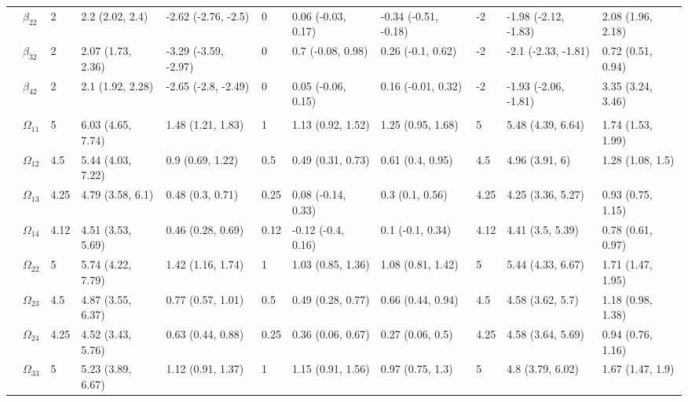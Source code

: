 \documentclass[]{article}
\begin{document}
\begin{landscape}
\begin{table}[t]
\begin{tabular}{lllllllllll}
\hspace{1em} & $\beta_{22}$ & 2 & 2.2 (2.02, 2.4) & -2.62 (-2.76, -2.5) & 0 & 0.06 (-0.03, 0.17) & -0.34 (-0.51, -0.18) & -2 & -1.98 (-2.12, -1.83) & 2.08 (1.96, 2.18)\\
\hspace{1em} & $\beta_{32}$ & 2 & 2.07 (1.73, 2.36) & -3.29 (-3.59, -2.97) & 0 & 0.7 (-0.08, 0.98) & 0.26 (-0.1, 0.62) & -2 & -2.1 (-2.33, -1.81) & 0.72 (0.51, 0.94)\\
\hspace{1em} & $\beta_{42}$ & 2 & 2.1 (1.92, 2.28) & -2.65 (-2.8, -2.49) & 0 & 0.05 (-0.06, 0.15) & 0.16 (-0.01, 0.32) & -2 & -1.93 (-2.06, -1.81) & 3.35 (3.24, 3.46)\\
\addlinespace[0.3em]
\multicolumn{11}{l}{\textbf{ }}\\
\hspace{1em} & $\Omega_{11}$ & 5 & 6.03 (4.65, 7.74) & 1.48 (1.21, 1.83) & 1 & 1.13 (0.92, 1.52) & 1.25 (0.95, 1.68) & 5 & 5.48 (4.39, 6.64) & 1.74 (1.53, 1.99)\\
\hspace{1em} & $\Omega_{12}$ & 4.5 & 5.44 (4.03, 7.22) & 0.9 (0.69, 1.22) & 0.5 & 0.49 (0.31, 0.73) & 0.61 (0.4, 0.95) & 4.5 & 4.96 (3.91, 6) & 1.28 (1.08, 1.5)\\
\hspace{1em} & $\Omega_{13}$ & 4.25 & 4.79 (3.58, 6.1) & 0.48 (0.3, 0.71) & 0.25 & 0.08 (-0.14, 0.33) & 0.3 (0.1, 0.56) & 4.25 & 4.25 (3.36, 5.27) & 0.93 (0.75, 1.15)\\
\hspace{1em} & $\Omega_{14}$ & 4.12 & 4.51 (3.53, 5.69) & 0.46 (0.28, 0.69) & 0.12 & -0.12 (-0.4, 0.16) & 0.1 (-0.1, 0.34) & 4.12 & 4.41 (3.5, 5.39) & 0.78 (0.61, 0.97)\\
\hspace{1em} & $\Omega_{22}$ & 5 & 5.74 (4.22, 7.79) & 1.42 (1.16, 1.74) & 1 & 1.03 (0.85, 1.36) & 1.08 (0.81, 1.42) & 5 & 5.44 (4.33, 6.67) & 1.71 (1.47, 1.95)\\
\hspace{1em} & $\Omega_{23}$ & 4.5 & 4.87 (3.55, 6.37) & 0.77 (0.57, 1.01) & 0.5 & 0.49 (0.28, 0.77) & 0.66 (0.44, 0.94) & 4.5 & 4.58 (3.62, 5.7) & 1.18 (0.98, 1.38)\\
\hspace{1em} & $\Omega_{24}$ & 4.25 & 4.52 (3.43, 5.76) & 0.63 (0.44, 0.88) & 0.25 & 0.36 (0.06, 0.67) & 0.27 (0.06, 0.5) & 4.25 & 4.58 (3.64, 5.69) & 0.94 (0.76, 1.16)\\
\hspace{1em} & $\Omega_{33}$ & 5 & 5.23 (3.89, 6.67) & 1.12 (0.91, 1.37) & 1 & 1.15 (0.91, 1.56) & 0.97 (0.75, 1.3) & 5 & 4.8 (3.79, 6.02) & 1.67 (1.47, 1.9)\\

\end{tabular}
\end{table}
\end{landscape}
\end{document}
